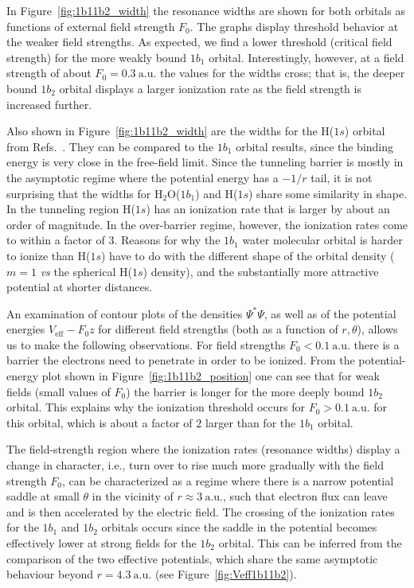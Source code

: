 In Figure~\ref{fig:1b11b2_width} the resonance widths are shown for
both orbitals as functions of external field strength $F_{0}$. The
graphs display threshold behavior at the weaker field strengths. As
expected, we find a lower threshold (critical field strength) for the
more weakly bound $1b_{1}$ orbital. Interestingly, however, at a field
strength of about $F_{0} = 0.3\ \mathrm{a.u.}$ the values for the
widths cross; that is, the deeper bound $1b_{2}$ orbital displays a
larger ionization rate as the field strength is increased further.

Also shown in Figure~\ref{fig:1b11b2_width} are the widths for the
H($1s$) orbital from Refs.~\cite{Telnov_1989,Kolosov_1987}. They can
be compared to the $1b_{1}$ orbital results, since the binding energy
is very close in the free-field limit. Since the tunneling barrier is
mostly in the asymptotic regime where the potential energy has a
$-1/r$ tail, it is not surprising that the widths for
H$_{2}$O($1b_{1}$) and H($1s$) share some similarity in shape. In the
tunneling region H($1s$) has an ionization rate that is larger by
about an order of magnitude. In the over-barrier regime, however, the
ionization rates come to within a factor of 3. Reasons for why the
$1b_1$ water molecular orbital is harder to ionize than H($1s$) have
to do with the different shape of the orbital density ($m=1$ \emph{vs}
the spherical H($1s$) density), and the substantially more attractive
potential at shorter distances.

An examination of contour plots of the densities $\Psi^{*}\Psi$, as
well as of the potential energies $V_{\mathrm{eff}} - F_{0}z$ for
different field strengths (both as a function of $r,\theta$), allows
us to make the following observations. For field strengths $F_{0} <
0.1\ \mathrm{a.u.}$ there is a barrier the electrons need to penetrate
in order to be ionized. From the potential-energy plot shown in
Figure~\ref{fig:1b11b2_position} one can see that for weak fields
(small values of $F_{0}$) the barrier is longer for the more deeply
bound $1b_{2}$ orbital. This explains why the ionization threshold
occurs for $F_{0} > 0.1\ \mathrm{a.u.}$ for this orbital, which is
about a factor of $2$ larger than for the $1b_{1}$ orbital.

The field-strength region where the ionization rates (resonance
widths) display a change in character, i.e., turn over to rise much
more gradually with the field strength $F_{0}$, can be characterized
as a regime where there is a narrow potential saddle at small $\theta$
in the vicinity of $r \approx 3\ \mathrm{a.u.}$, such that electron
flux can leave and is then accelerated by the electric field. The
crossing of the ionization rates for the $1b_{1}$ and $1b_{2}$
orbitals occurs since the saddle in the potential becomes effectively
lower at strong fields for the $1b_{2}$ orbital. This can be inferred
from the comparison of the two effective potentials, which share the
same asymptotic behaviour beyond $r = 4.3\ \mathrm{a.u.}$ (see
Figure~\ref{fig:Veff1b11b2}).

